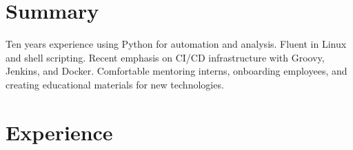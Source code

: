 \documentclass[12pt,letterpaper]{article}
\newcommand{\ResumeSection}[1]{\section*{{\color{MidnightBlue}#1 \sout{\hfill}}}}
\begin{document}

\ResumeSection{Summary}

Ten years experience using Python for automation and analysis. Fluent in Linux and shell scripting. Recent emphasis on CI/CD infrastructure with Groovy, Jenkins, and Docker. Comfortable mentoring interns, onboarding employees, and creating educational materials for new technologies.





\ResumeSection{Experience}
\end{document}
